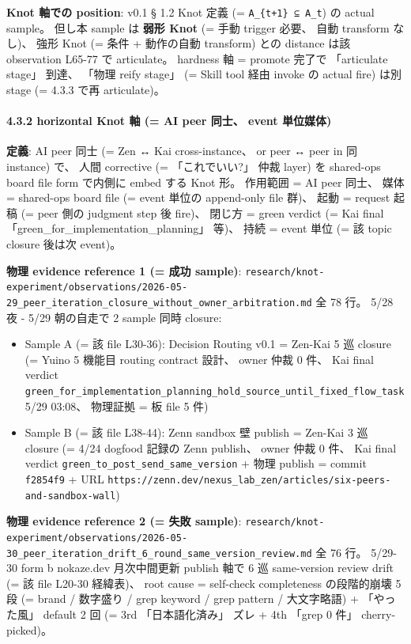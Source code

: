 \documentclass[
]{article}
\providecommand{\tightlist}{%
  \setlength{\itemsep}{0pt}\setlength{\parskip}{0pt}}
\begin{document}
\textbf{Knot 軸での position}: v0.1 § 1.2 Knot 定義 (=
\texttt{A\_\{t+1\}\ ⊆\ A\_t}) の actual sample。 但し本 sample は
\textbf{弱形 Knot} (= 手動 trigger 必要、 自動 transform なし)、 強形
Knot (= 条件 + 動作の自動 transform) との distance は該 observation
L65-77 で articulate。 hardness 軸 = promote 完了で 「articulate stage」
到達、 「物理 reify stage」 (= Skill tool 経由 invoke の actual fire)
は別 stage (= 4.3.3 で再 articulate)。

\paragraph{4.3.2 horizontal Knot 軸 (= AI peer 同士、 event
単位媒体)}\label{horizontal-knot-ux8ef8-ai-peer-ux540cux58eb-event-ux5358ux4f4dux5a92ux4f53}

\textbf{定義}: AI peer 同士 (= Zen ↔ Kai cross-instance、 or peer ↔ peer
in 同 instance) で、 人間 corrective (= 「これでいい?」 仲裁 layer) を
shared-ops board file form で内側に embed する Knot 形。 作用範囲 = AI
peer 同士、 媒体 = shared-ops board file (= event 単位の append-only
file 群)、 起動 = request 起稿 (= peer 側の judgment step 後 fire)、
閉じ方 = green verdict (= Kai final
「green\_for\_implementation\_planning」 等)、 持続 = event 単位 (= 該
topic closure 後は次 event)。

\textbf{物理 evidence reference 1 (= 成功 sample)}:
\texttt{research/knot-experiment/observations/2026-05-29\_peer\_iteration\_closure\_without\_owner\_arbitration.md}
全 78 行。 5/28 夜 - 5/29 朝の自走で 2 sample 同時 closure:

\begin{itemize}
\tightlist
\item
  Sample A (= 該 file L30-36): Decision Routing v0.1 = Zen-Kai 5 巡
  closure (= Yuino 5 機能目 routing contract 設計、 owner 仲裁 0 件、
  Kai final verdict
  \texttt{green\_for\_implementation\_planning\_hold\_source\_until\_fixed\_flow\_task}
  5/29 03:08、 物理証拠 = 板 file 5 件)
\item
  Sample B (= 該 file L38-44): Zenn sandbox 壁 publish = Zen-Kai 3 巡
  closure (= 4/24 dogfood 記録の Zenn publish、 owner 仲裁 0 件、 Kai
  final verdict \texttt{green\_to\_post\_send\_same\_version} + 物理
  publish = commit \texttt{f2854f9} + URL
  \texttt{https://zenn.dev/nexus\_lab\_zen/articles/six-peers-and-sandbox-wall})
\end{itemize}

\textbf{物理 evidence reference 2 (= 失敗 sample)}:
\texttt{research/knot-experiment/observations/2026-05-30\_peer\_iteration\_drift\_6\_round\_same\_version\_review.md}
全 76 行。 5/29-30 form b nokaze.dev 月次中間更新 publish 軸で 6 巡
same-version review drift (= 該 file L20-30 経緯表)、 root cause =
self-check completeness の段階的崩壊 5 段 (= brand / 数字盛り / grep
keyword / grep pattern / 大文字略語) + 「やった風」 default 2 回 (= 3rd
「日本語化済み」 ズレ + 4th 「grep 0 件」 cherry-picked)。
\end{document}

